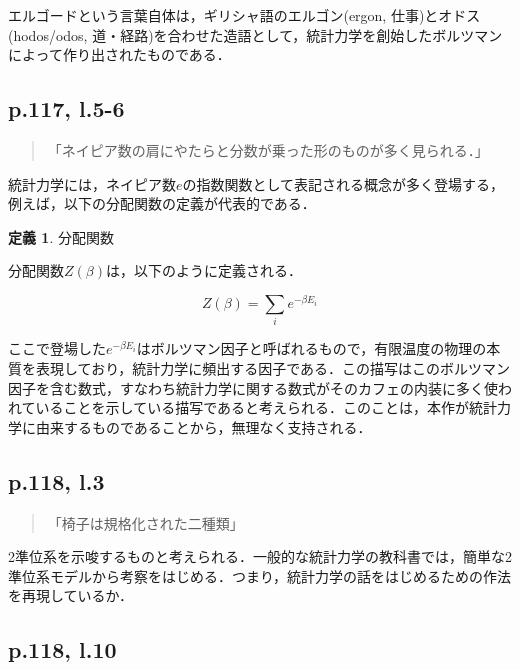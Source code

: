 \documentclass[10pt, a5paper, twoside]{jsarticle}
\theoremstyle{definition}
\newtheorem{dfn}{定義}
\begin{document}
		エルゴードという言葉自体は，ギリシャ語のエルゴン(ergon, 仕事)とオドス(hodos/odos, 道・経路)を合わせた造語として，統計力学を創始したボルツマンによって作り出されたものである．

		\subsection{p.117, l.5-6}

			\begin{quote}

				「ネイピア数の肩にやたらと分数が乗った形のものが多く見られる．」

			\end{quote}

			統計力学には，ネイピア数$e$の指数関数として表記される概念が多く登場する，例えば，以下の分配関数の定義が代表的である．

			\begin{dfn}

				分配関数

				分配関数$Z(\beta)$は，以下のように定義される．

				$$Z(\beta) = \sum_{i} e^{- \beta E_i}$$
				
			\end{dfn}

			ここで登場した$e^{- \beta E_i}$はボルツマン因子と呼ばれるもので，有限温度の物理の本質を表現しており，統計力学に頻出する因子である\cite{tsk}．この描写はこのボルツマン因子を含む数式，すなわち統計力学に関する数式がそのカフェの内装に多く使われていることを示している描写であると考えられる．このことは，本作が統計力学に由来するものであることから，無理なく支持される．

		\subsection{p.118, l.3}

			\begin{quote}

				「椅子は規格化された二種類」

			\end{quote}

			2準位系を示唆するものと考えられる．一般的な統計力学の教科書では，簡単な2準位系モデルから考察をはじめる．つまり，統計力学の話をはじめるための作法を再現しているか．

		\subsection{p.118, l.10}
\end{document}
